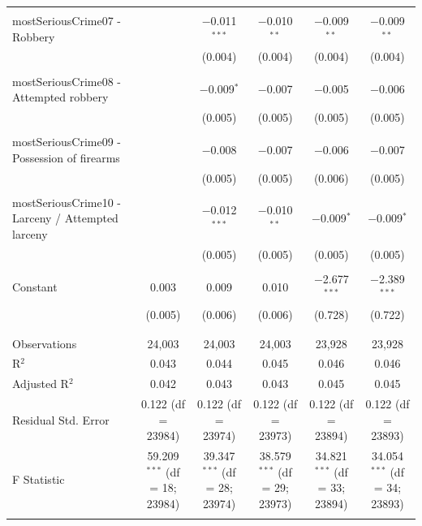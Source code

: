 \documentclass[a4paper,12pt]{article}
\begin{document}
\begin{table}[!htbp]
{\begin{tabular}{@{\extracolsep{5pt}}lccccc}
  & & & & & \\ 
 mostSeriousCrime07 - Robbery &  & $-$0.011$^{***}$ & $-$0.010$^{**}$ & $-$0.009$^{**}$ & $-$0.009$^{**}$ \\ 
  &  & (0.004) & (0.004) & (0.004) & (0.004) \\ 
  & & & & & \\ 
 mostSeriousCrime08 - Attempted robbery &  & $-$0.009$^{*}$ & $-$0.007 & $-$0.005 & $-$0.006 \\ 
  &  & (0.005) & (0.005) & (0.005) & (0.005) \\ 
  & & & & & \\ 
 mostSeriousCrime09 - Possession of firearms &  & $-$0.008 & $-$0.007 & $-$0.006 & $-$0.007 \\ 
  &  & (0.005) & (0.005) & (0.006) & (0.005) \\ 
  & & & & & \\ 
 mostSeriousCrime10 - Larceny / Attempted larceny &  & $-$0.012$^{***}$ & $-$0.010$^{**}$ & $-$0.009$^{*}$ & $-$0.009$^{*}$ \\ 
  &  & (0.005) & (0.005) & (0.005) & (0.005) \\ 
  & & & & & \\ 
  
 Constant & 0.003 & 0.009 & 0.010 & $-$2.677$^{***}$ & $-$2.389$^{***}$ \\ 
  & (0.005) & (0.006) & (0.006) & (0.728) & (0.722) \\ 
  & & & & & \\ 
\hline \\[-1.8ex] 
Observations & 24,003 & 24,003 & 24,003 & 23,928 & 23,928 \\ 
R$^{2}$ & 0.043 & 0.044 & 0.045 & 0.046 & 0.046 \\ 
Adjusted R$^{2}$ & 0.042 & 0.043 & 0.043 & 0.045 & 0.045 \\ 
Residual Std. Error & 0.122 (df = 23984) & 0.122 (df = 23974) & 0.122 (df = 23973) & 0.122 (df = 23894) & 0.122 (df = 23893) \\ 
F Statistic & 59.209$^{***}$ (df = 18; 23984) & 39.347$^{***}$ (df = 28; 23974) & 38.579$^{***}$ (df = 29; 23973) & 34.821$^{***}$ (df = 33; 23894) & 34.054$^{***}$ (df = 34; 23893) \\ 
\hline 
\hline \\[-1.8ex] 

\end{tabular} }
\end{table} 

\end{document}

